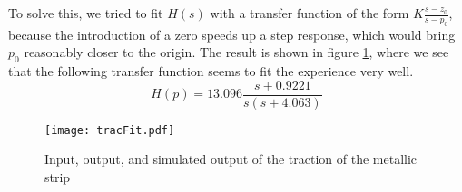 To solve this, we tried to fit $H(s)$ with a transfer function of the form $K\frac{s-z_0}{s-p_0}$, because the introduction of a zero speeds up a step response, which would bring $p_0$ reasonably closer to the origin. The result is shown in figure \ref{fig:tracFit}, where we see that the following transfer function seems to fit the experience very well.
\[H(p) = 13.096\frac{s+0.9221}{s(s+4.063)}\]
\begin{figure}[htbp]
\centering
\texttt{[image: tracFit.pdf]}
\caption{Input, output, and simulated output of the traction of the metallic strip\label{fig:tracFit}}
\end{figure}

